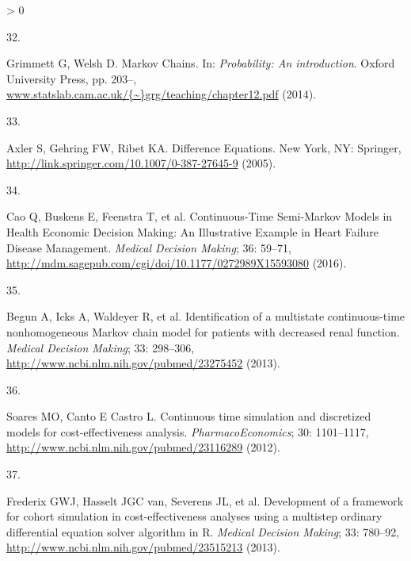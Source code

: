 \documentclass[
]{article}
\newlength{\cslhangindent}
\newlength{\csllabelwidth}
\newenvironment{CSLReferences}[2] %
 {%
  \setlength{\parindent}{0pt}
  \ifodd #1 \everypar{\setlength{\hangindent}{\cslhangindent}}\ignorespaces\fi
  \ifnum #2 > 0
  \setlength{\parskip}{#2\baselineskip}
  \fi
 }%
 {}
\newcommand{\CSLLeftMargin}[1]{\parbox[t]{\csllabelwidth}{#1}}
\newcommand{\CSLRightInline}[1]{\parbox[t]{\linewidth - \csllabelwidth}{#1}\break}
\begin{document}
\begin{CSLReferences}{0}{0}
\leavevmode\hypertarget{ref-Grimmett2014}{}%
\CSLLeftMargin{32. }
\CSLRightInline{Grimmett G, Welsh D. {Markov Chains}. In: \emph{Probability: An introduction}. Oxford University Press, pp. 203--, \href{https://www.statslab.cam.ac.uk/\%7B~\%7Dgrg/teaching/chapter12.pdf}{www.statslab.cam.ac.uk/\{\textasciitilde\}grg/teaching/chapter12.pdf} (2014).}

\leavevmode\hypertarget{ref-Axler2005}{}%
\CSLLeftMargin{33. }
\CSLRightInline{Axler S, Gehring FW, Ribet KA. {Difference Equations}. New York, NY: Springer, \url{http://link.springer.com/10.1007/0-387-27645-9} (2005).}

\leavevmode\hypertarget{ref-Cao2016}{}%
\CSLLeftMargin{34. }
\CSLRightInline{Cao Q, Buskens E, Feenstra T, et al. {Continuous-Time Semi-Markov Models in Health Economic Decision Making: An Illustrative Example in Heart Failure Disease Management}. \emph{Medical Decision Making}; 36: 59--71, \url{http://mdm.sagepub.com/cgi/doi/10.1177/0272989X15593080} (2016).}

\leavevmode\hypertarget{ref-Begun2013}{}%
\CSLLeftMargin{35. }
\CSLRightInline{Begun A, Icks A, Waldeyer R, et al. {Identification of a multistate continuous-time nonhomogeneous Markov chain model for patients with decreased renal function.} \emph{Medical Decision Making}; 33: 298--306, \url{http://www.ncbi.nlm.nih.gov/pubmed/23275452} (2013).}

\leavevmode\hypertarget{ref-Soares2012}{}%
\CSLLeftMargin{36. }
\CSLRightInline{Soares MO, Canto E Castro L. {Continuous time simulation and discretized models for cost-effectiveness analysis}. \emph{PharmacoEconomics}; 30: 1101--1117, \url{http://www.ncbi.nlm.nih.gov/pubmed/23116289} (2012).}

\leavevmode\hypertarget{ref-Frederix2013a}{}%
\CSLLeftMargin{37. }
\CSLRightInline{Frederix GWJ, Hasselt JGC van, Severens JL, et al. {Development of a framework for cohort simulation in cost-effectiveness analyses using a multistep ordinary differential equation solver algorithm in R.} \emph{Medical Decision Making}; 33: 780--92, \url{http://www.ncbi.nlm.nih.gov/pubmed/23515213} (2013).}

\end{CSLReferences}
\end{document}
